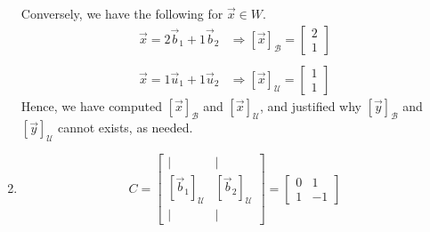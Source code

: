 \begin{SaveQuestion}
\begin{enumerate}
        Conversely, we have the following for $\vec x \in W$. 
        $$\begin{array}{cr}
            \vec x = 2 \vec b_1 + 1 \vec b_2 & \Longrightarrow [\vec x]_{\mathcal B} = \begin{bmatrix} 2 \\ 1 \end{bmatrix} \\ \\
            \vec x = 1 \vec u_1 + 1 \vec u_2 & \Longrightarrow [\vec x]_{\mathcal U} = \begin{bmatrix} 1 \\ 1 \end{bmatrix}
        \end{array}$$
        Hence, we have computed $[\vec x]_{\mathcal B}$ and $[\vec x]_{\mathcal U}$, and justified why $[\vec y]_{\mathcal B}$ and $[\vec y]_{\mathcal U}$ cannot exists, as needed. 
        \item 
        $$C = \begin{bmatrix} | & | \\ [\vec b_1]_{\mathcal U} & [\vec b_2]_{\mathcal U} \\ | & | \end{bmatrix} = \begin{bmatrix} 0 & 1 \\ 1 & -1 \end{bmatrix}$$
    \end{enumerate}

\end{SaveQuestion}
